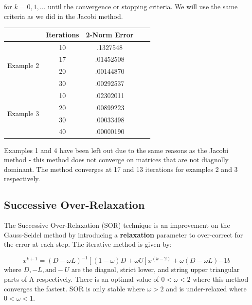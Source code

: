 \documentclass[11pt]{article}	%
\begin{document}
for $k = 0, 1, ...$ until the convergence or stopping criteria. We will use the same criteria as we did in the Jacobi method.

\begin{center}
	 \label{tab:title}
    \begin{tabular}{||c|c|c|c|c||}
        \hline
        & Iterations & 2-Norm Error \\ [.35em]
        \hline
        \multirow{4}{5em}{Example 2} & 10 & .1327548 \\ [.25em]
        & 17 & .01452508 \\ [.25em]
        & 20 & .00144870 \\ [.25em]
        & 30 & .00292537 \\ [.25em]
        \hline
        \multirow{4}{5em}{Example 3} & 10 & .02302011 \\ [.25em]
        & 20 & .00899223 \\ [.25em]
        & 30 & .00033498 \\ [.25em]
        & 40 & .00000190 \\ [.25em]
        \hline
    \end{tabular}
\end{center}
Examples 1 and 4 have been left out due to the same reasons as the Jacobi method - this method does not converge on matrices that are not diagnolly dominant. The method converges at 17 and 13 iterations for examples 2 and 3 respectively.

\subsection{Successive Over-Relaxation}
The Successive Over-Relaxation (SOR) technique is an improvement on the Gauss-Seidel method by introducing a \textbf{relaxation} parameter to over-correct for the error at each step. The iterative method is given by:

\begin{equation}\label{eq:successive-over-relax-eq-1}
    x^{k+1} = (D - \omega L)^{-1}[(1 - \omega)D + \omega U]x^{(k-2)} + \omega(D - \omega L){-1}b
\end{equation}
where $D, -L, \textrm{and} -U$ are the diagnol, strict lower, and string upper triangular parts of A respectively. There is an optimal value of $0 < \omega < 2$ where this method converges the fastest. SOR is only stable where $\omega > 2$ and is under-relaxed where $0 < \omega < 1$.
\end{document}
